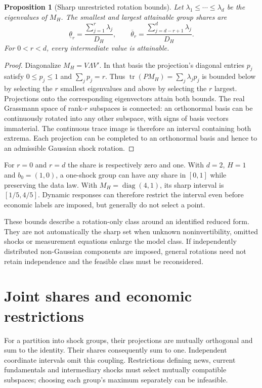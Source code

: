 \documentclass[11pt]{article}
\newtheorem{proposition}{Proposition}
\begin{document}
\begin{proposition}[Sharp unrestricted rotation bounds]
Let $\lambda_1\leq\cdots\leq\lambda_d$ be the eigenvalues of $M_H$. The smallest and largest attainable group shares are
\[
 \underline\theta_r=\frac{\sum_{j=1}^r\lambda_j}{D_H},
 \qquad
 \overline\theta_r=\frac{\sum_{j=d-r+1}^d\lambda_j}{D_H}.
\]
For $0<r<d$, every intermediate value is attainable.
\end{proposition}
\begin{proof}
Diagonalize $M_H=V\Lambda V'$. In that basis the projection's diagonal entries $p_j$ satisfy $0\leq p_j\leq1$ and $\sum_jp_j=r$. Thus $\operatorname{tr}(PM_H)=\sum_j\lambda_jp_j$ is bounded below by selecting the $r$ smallest eigenvalues and above by selecting the $r$ largest. Projections onto the corresponding eigenvectors attain both bounds. The real Grassmann space of rank-$r$ subspaces is connected: an orthonormal basis can be continuously rotated into any other subspace, with signs of basis vectors immaterial. The continuous trace image is therefore an interval containing both extrema. Each projection can be completed to an orthonormal basis and hence to an admissible Gaussian shock rotation.
\end{proof}

For $r=0$ and $r=d$ the share is respectively zero and one. With $d=2$, $H=1$ and $b_0=(1,0)$, a one-shock group can have any share in $[0,1]$ while preserving the data law. With $M_H=\operatorname{diag}(4,1)$, its sharp interval is $[1/5,4/5]$. Dynamic responses can therefore restrict the interval even before economic labels are imposed, but generally do not select a point.

These bounds describe a rotation-only class around an identified reduced form. They are not automatically the sharp set when unknown noninvertibility, omitted shocks or measurement equations enlarge the model class. If independently distributed non-Gaussian components are imposed, general rotations need not retain independence and the feasible class must be reconsidered.

\section*{Joint shares and economic restrictions}
For a partition into shock groups, their projections are mutually orthogonal and sum to the identity. Their shares consequently sum to one. Independent coordinate intervals omit this coupling. Restrictions defining news, current fundamentals and intermediary shocks must select mutually compatible subspaces; choosing each group's maximum separately can be infeasible.
\end{document}
